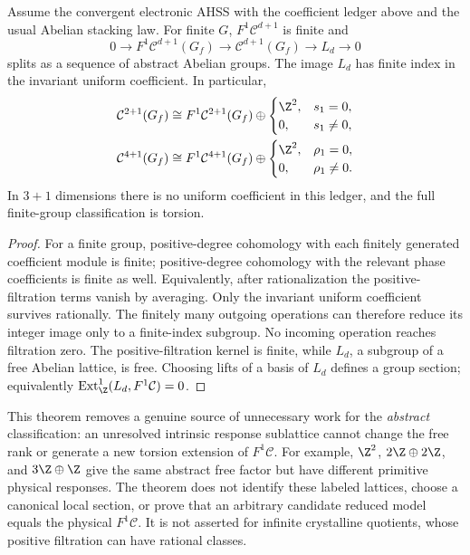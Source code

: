 \begin{theorem}\label{thm:uniform-split}
Assume the convergent electronic AHSS with the coefficient ledger above and the usual Abelian stacking law. For finite $G$, $F^1\mathcal C^{d+1}$ is finite and
\begin{equation}\label{eq:uniform-exact}
0\longrightarrow F^1\mathcal C^{d+1}(G_f)
\longrightarrow\mathcal C^{d+1}(G_f)
\longrightarrow L_d\longrightarrow0
\end{equation}
splits as a sequence of abstract Abelian groups. The image $L_d$ has finite index in the invariant uniform coefficient. In particular,
\begin{equation}\label{eq:abstract-ranks}
\begin{aligned}
\mathcal C^{2+1}(G_f)&\cong F^1\mathcal C^{2+1}(G_f)\oplus
\begin{cases}\Z^2,&s_1=0,\\0,&s_1\ne0,\end{cases}\\
\mathcal C^{4+1}(G_f)&\cong F^1\mathcal C^{4+1}(G_f)\oplus
\begin{cases}\Z^2,&\rho_1=0,\\0,&\rho_1\ne0.\end{cases}
\end{aligned}
\end{equation}
In $3+1$ dimensions there is no uniform coefficient in this ledger, and the full finite-group classification is torsion.
\end{theorem}
\begin{proof}
For a finite group, positive-degree cohomology with each finitely generated coefficient module is finite; positive-degree cohomology with the relevant phase coefficients is finite as well. Equivalently, after rationalization the positive-filtration terms vanish by averaging. Only the invariant uniform coefficient survives rationally. The finitely many outgoing operations can therefore reduce its integer image only to a finite-index subgroup. No incoming operation reaches filtration zero. The positive-filtration kernel is finite, while $L_d$, a subgroup of a free Abelian lattice, is free. Choosing lifts of a basis of $L_d$ defines a group section; equivalently $\operatorname{Ext}^1_\Z(L_d,F^1\mathcal C)=0$.
\end{proof}

This theorem removes a genuine source of unnecessary work for the \emph{abstract} classification: an unresolved intrinsic response sublattice cannot change the free rank or generate a new torsion extension of $F^1\mathcal C$. For example, $\Z^2$, $2\Z\oplus2\Z$, and $3\Z\oplus\Z$ give the same abstract free factor but have different primitive physical responses. The theorem does not identify these labeled lattices, choose a canonical local section, or prove that an arbitrary candidate reduced model equals the physical $F^1\mathcal C$. It is not asserted for infinite crystalline quotients, whose positive filtration can have rational classes.

